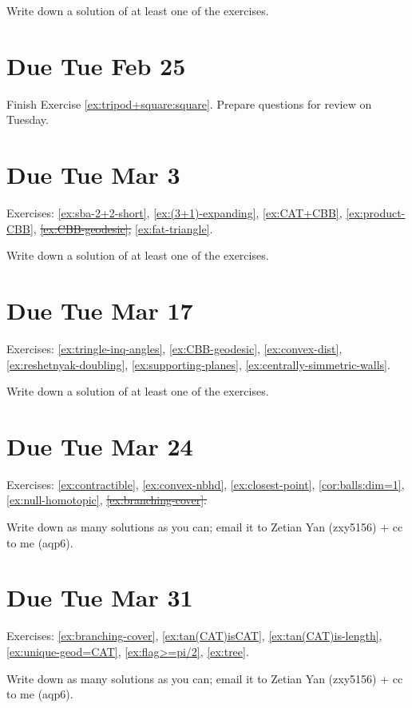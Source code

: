 \noindent Write down a solution of at least one of the exercises.

\section{Due Tue Feb 25}

Finish Exercise \ref{ex:tripod+square:square}.
Prepare questions for review on Tuesday.

\section{Due Tue Mar 3}

Exercises: \ref{ex:sba-2+2-short}, \ref{ex:(3+1)-expanding}, \ref{ex:CAT+CBB}, \ref{ex:product-CBB}, \sout{\ref{ex:CBB-geodesic},} \ref{ex:fat-triangle}.

\noindent Write down a solution of at least one of the exercises.

\section{Due Tue Mar 17}

Exercises: \ref{ex:tringle-inq-angles},
\ref{ex:CBB-geodesic},
\ref{ex:convex-dist},
\ref{ex:reshetnyak-doubling},
\ref{ex:supporting-planes},
\ref{ex:centrally-simmetric-walls}.

\noindent Write down a solution of at least one of the exercises.

\section{Due Tue Mar 24}

Exercises: 
\ref{ex:contractible},
\ref{ex:convex-nbhd},
\ref{ex:closest-point},
\ref{cor:balls:dim=1},
\ref{ex:null-homotopic},
\sout{\ref{ex:branching-cover}.}

 Write down as many solutions as you can; email it to Zetian Yan (zxy5156) + cc to me (aqp6).

\section{Due Tue Mar 31}

Exercises: 
\ref{ex:branching-cover},
\ref{ex:tan(CAT)isCAT},
\ref{ex:tan(CAT)is-length},
\ref{ex:unique-geod=CAT},
\ref{ex:flag>=pi/2},
\ref{ex:tree}.

Write down as many solutions as you can; email it to Zetian Yan (zxy5156) + cc to me (aqp6).

